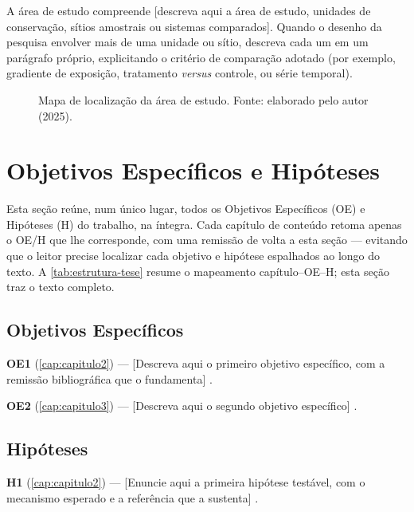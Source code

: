 A área de estudo compreende [descreva aqui a área de estudo, unidades
de conservação, sítios amostrais ou sistemas comparados]. Quando o
desenho da pesquisa envolver mais de uma unidade ou sítio, descreva
cada um em um parágrafo próprio, explicitando o critério de
comparação adotado (por exemplo, gradiente de exposição, tratamento
\textit{versus} controle, ou série temporal).

\begin{figure}[H]
  \centering
  \fbox{\rule{0pt}{5cm}\rule{10cm}{0pt}}
  \caption{Mapa de localização da área de estudo. Fonte: elaborado
           pelo autor (2025).}
  \label{fig:area-estudo-capitulado}
\end{figure}

\section{Objetivos Específicos e Hipóteses}
\label{sec:oe-h}

Esta seção reúne, num único lugar, todos os Objetivos Específicos
(OE) e Hipóteses (H) do trabalho, na íntegra. Cada capítulo de
conteúdo retoma apenas o OE/H que lhe corresponde, com uma remissão de
volta a esta seção — evitando que o leitor precise localizar cada
objetivo e hipótese espalhados ao longo do texto. A
\autoref{tab:estrutura-tese} resume o mapeamento capítulo–OE–H; esta
seção traz o texto completo.

\subsection{Objetivos Específicos}

\textbf{OE1} (\autoref{cap:capitulo2}) — [Descreva aqui o primeiro
objetivo específico, com a remissão bibliográfica que o fundamenta]
\cite{exemplo:artigo:2024}.

\textbf{OE2} (\autoref{cap:capitulo3}) — [Descreva aqui o segundo
objetivo específico] \cite{exemplo:dissertacao:2022}.

\subsection{Hipóteses}

\textbf{H1} (\autoref{cap:capitulo2}) — [Enuncie aqui a primeira
hipótese testável, com o mecanismo esperado e a referência que a
sustenta] \cite{exemplo:capitulo:2019}.
